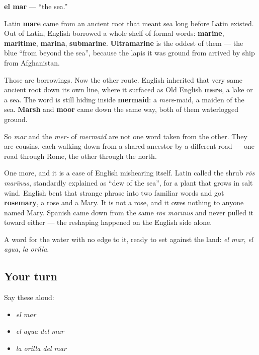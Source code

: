 \begin{cousinweb}
\textbf{el mar} — \textquotedblleft{}the sea.\textquotedblright{}

Latin \textbf{mare} came from an ancient root that meant sea long before Latin existed. Out of Latin, English borrowed a whole shelf of formal words: \textbf{marine}, \textbf{maritime}, \textbf{marina}, \textbf{submarine}. \textbf{Ultramarine} is the oddest of them — the blue \textquotedblleft{}from beyond the sea\textquotedblright{}, because the lapis it was ground from arrived by ship from Afghanistan.

Those are borrowings. Now the other route. English inherited that very same ancient root down its own line, where it surfaced as Old English \textbf{mere}, a lake or a sea. The word is still hiding inside \textbf{mermaid}: a \emph{mere}-maid, a maiden of the sea. \textbf{Marsh} and \textbf{moor} came down the same way, both of them waterlogged ground.

So \emph{mar} and the \emph{mer-} of \emph{mermaid} are not one word taken from the other. They are cousins, each walking down from a shared ancestor by a different road — one road through Rome, the other through the north.

One more, and it is a case of English mishearing itself. Latin called the shrub \emph{rōs marīnus}, standardly explained as \textquotedblleft{}dew of the sea\textquotedblright{}, for a plant that grows in salt wind. English bent that strange phrase into two familiar words and got \textbf{rosemary}, a rose and a Mary. It is not a rose, and it owes nothing to anyone named Mary. Spanish came down from the same \emph{rōs marīnus} and never pulled it toward either — the reshaping happened on the English side alone.
\end{cousinweb}

\begin{grammarlens}[title={What you've built}]
A word for the water with no edge to it, ready to set against the land: \emph{el mar}, \emph{el agua}, \emph{la orilla}.
\end{grammarlens}

\subsection*{Your turn}
Say these aloud:

\begin{itemize}
\raggedright
  \item \emph{el mar}
  \item \emph{el agua del mar}
  \item \emph{la orilla del mar}
\end{itemize}

